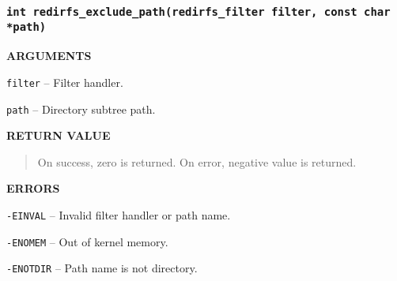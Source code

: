\subsubsection{\texttt{int redirfs\_exclude\_path(redirfs\_filter filter, const char *path)}}
\begin{list}{}{}
	\item \textbf{ARGUMENTS}
		\begin{list}{}{}
			\item \texttt{filter} -- Filter handler.
			\item \texttt{path} -- Directory subtree path.
		\end{list}
	\item \textbf{RETURN VALUE}
		\begin{quotation}
			\noindent On success, zero is returned. On error, negative
			value is returned.
		\end{quotation}
	\item \textbf{ERRORS}
		\begin{list}{}{}
			\item \texttt{-EINVAL} -- Invalid filter handler or path name.
			\item \texttt{-ENOMEM} -- Out of kernel memory.
			\item \texttt{-ENOTDIR} -- Path name is not directory.
		\end{list}
\end{list}
